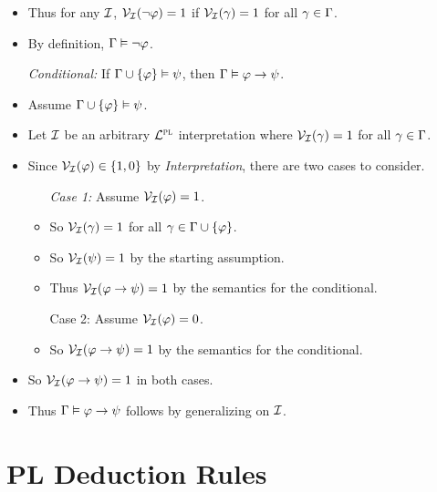 \documentclass[a4paper, 11pt]{article} %
\begin{document}
\begin{itemize}
    \item Thus for any $\mathcal{I}$, $\mathcal{V}_{\mathcal{I}}(\neg \varphi) = 1$ if $\mathcal{V}_{\mathcal{I}}(\gamma) = 1$ for all $\gamma \in \Gamma$.
    \item By definition, $\Gamma \vDash \neg\varphi$.
  \item[\it Conditional:] If $\Gamma \cup \lbrace\varphi\rbrace \vDash \psi$, then $\Gamma \vDash \varphi \rightarrow \psi$.
    \item Assume $\Gamma \cup \lbrace\varphi\rbrace \vDash \psi$.
    \item Let $\mathcal{I}$ be an arbitrary $\mathcal{L}^{\textsc{pl}}$ interpretation where $\mathcal{V}_{\mathcal{I}}(\gamma) = 1$ for all $\gamma \in \Gamma$.
    \item Since $\mathcal{V}_{\mathcal{I}}(\varphi) \in \lbrace1,0\rbrace$ by \textit{Interpretation}, there are two cases to consider. 
    \begin{itemize}
      \item[\it Case 1:] Assume $\mathcal{V}_{\mathcal{I}}(\varphi) = 1$.
        \item So $\mathcal{V}_{\mathcal{I}}(\gamma) = 1$ for all $\gamma \in \Gamma \cup \lbrace\varphi\rbrace$.
        \item So $\mathcal{V}_{\mathcal{I}}(\psi) = 1$ by the starting assumption.
        \item Thus $\mathcal{V}_{\mathcal{I}}(\varphi \rightarrow \psi) = 1$ by the semantics for the conditional.
      \item[Case 2:] Assume $\mathcal{V}_{\mathcal{I}}(\varphi) = 0$.
        \item So $\mathcal{V}_{\mathcal{I}}(\varphi \rightarrow \psi) = 1$ by the semantics for the conditional.
    \end{itemize}
    \item So $\mathcal{V}_{\mathcal{I}}(\varphi \rightarrow \psi) = 1$ in both cases.
    \item Thus $\Gamma \vDash \varphi \rightarrow \psi$ follows by generalizing on $\mathcal{I}$. 
\end{itemize}




\section*{PL Deduction Rules}
\end{document}
